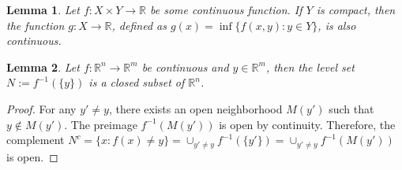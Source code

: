 \documentclass[a4paper]{article}
\theoremstyle{definition}
\theoremstyle{plain}
\newtheorem{lemma}{Lemma\hspace{0.25em}\ignorespaces}
\begin{document}
\begin{lemma}\label{lemma:inf-continuous}
  Let $f : X \times Y \rightarrow \mathbb{R}$ be some continuous function. If
  $Y$ is compact, then the function $g : X \rightarrow \mathbb{R}$, defined as
  $g(x) = \inf \{ f(x,y) : y\in Y\}$, is also continuous.
\end{lemma}

\begin{lemma}\label{lemma:levelset}
  Let $f :\mathbb{R}^{n} \rightarrow \mathbb{R}^{m}$ be continuous and
  $y \in \mathbb{R}^{m}$, then the level set $N := f^{-1}(\{ y \})$ is a closed
  subset of $\mathbb{R}^{n}$.
\end{lemma}
\begin{proof}
  For any $y' \neq y$, there exists an open neighborhood $M(y')$ such that
  $y \notin M(y')$. The preimage $f^{-1}(M(y'))$ is open by continuity.
  Therefore, the complement
  $N^{c} = \{ x : f(x) \neq y \} = \cup_{y' \neq y} f^{-1}(\{y'\}) = \cup_{y' \neq y} f^{-1}(M(y'))$
  is open.
\end{proof}
\end{document}
